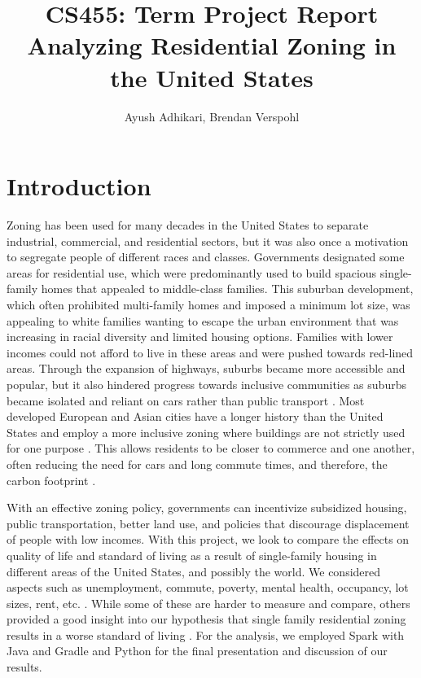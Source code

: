 \documentclass[titlepage]{article}
\begin{document}
\title{
  CS455: Term Project Report\\
  \large Analyzing Residential Zoning in the United States\\
}

\author{Ayush Adhikari, Brendan Verspohl}

\maketitle

\section{Introduction}
Zoning has been used for many decades in the United States to separate industrial, commercial, and residential sectors, but it was also once a motivation to segregate people of different races and classes. Governments designated some areas for residential use, which were predominantly used to build spacious single-family homes that appealed to middle-class families. This suburban development, which often prohibited multi-family homes and imposed a minimum lot size, was appealing to white families wanting to escape the urban environment that was increasing in racial diversity and limited housing options. Families with lower incomes could not afford to live in these areas and were pushed towards red-lined areas. Through the expansion of highways, suburbs became more accessible and popular, but it also hindered progress towards inclusive communities as suburbs became isolated and reliant on cars rather than public transport \cite{freemark}. Most developed European and Asian cities have a longer history than the United States and employ a more inclusive zoning where buildings are not strictly used for one purpose \cite{hertz}. This allows residents to be closer to commerce and one another, often reducing the need for cars and long commute times, and therefore, the carbon footprint \cite{romem}. 

With an effective zoning policy, governments can incentivize subsidized housing, public transportation, better land use, and policies that discourage displacement of people with low incomes. With this project, we look to compare the effects on quality of life and standard of living as a result of single-family housing in different areas of the United States, and possibly the world. We considered aspects such as unemployment, commute, poverty, mental health, occupancy, lot sizes, rent, etc. \cite{kaggle}. While some of these are harder to measure and compare, others provided a good insight into our hypothesis that single family residential zoning results in a worse standard of living \cite{uscensus}. For the analysis, we employed Spark with Java and Gradle and Python for the final presentation and discussion of our results. 
\end{document}
